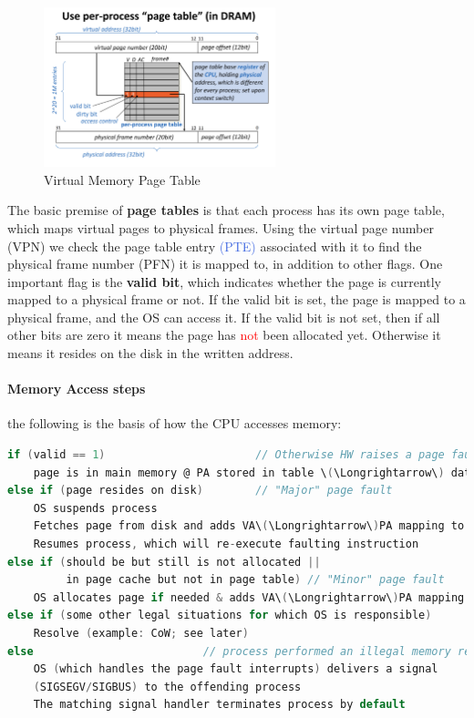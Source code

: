 \documentclass[openany,12pt]{book}
\newcommand{\red}[1]{\textcolor{Red}{#1}}
\newcommand{\blue}[1]{\textcolor{RoyalBlue}{#1}}
\begin{document}
\begin{figure}[h!]
  \centering
  \includegraphics[width=0.6\textwidth]{page-table.png}
  \caption{Virtual Memory Page Table}
\end{figure}


The basic premise of \textbf{page tables} is that each process has its own page table, which maps virtual pages to physical frames. Using the virtual page number (VPN) we check the page table entry \blue{(PTE)} associated with it to find the physical frame number (PFN) it is mapped to, in addition to other flags. One important flag is the \textbf{valid bit}, which indicates whether the page is currently mapped to a physical frame or not. If the valid bit is set, the page is mapped to a physical frame, and the OS can access it. If the valid bit is not set, then if all other bits are zero it means the page has \red{not} been allocated yet. Otherwise it means it resides on the disk in the written address. 



\paragraph{Memory Access steps} the following is the basis of how the CPU accesses memory:
\begin{lstlisting}[language=C, caption={Memory Access Steps in Virtual Memory}, label={lst:memory_access}]
if (valid == 1)                       // Otherwise HW raises a page fault interrupt
    page is in main memory @ PA stored in table \(\Longrightarrow\) data can be used
else if (page resides on disk)        // "Major" page fault
    OS suspends process
    Fetches page from disk and adds VA\(\Longrightarrow\)PA mapping to page table
    Resumes process, which will re-execute faulting instruction
else if (should be but still is not allocated ||
         in page cache but not in page table) // "Minor" page fault
    OS allocates page if needed & adds VA\(\Longrightarrow\)PA mapping to page table
else if (some other legal situations for which OS is responsible)
    Resolve (example: CoW; see later)
else                          // process performed an illegal memory ref
    OS (which handles the page fault interrupts) delivers a signal
    (SIGSEGV/SIGBUS) to the offending process
    The matching signal handler terminates process by default
\end{lstlisting}
\end{document}
